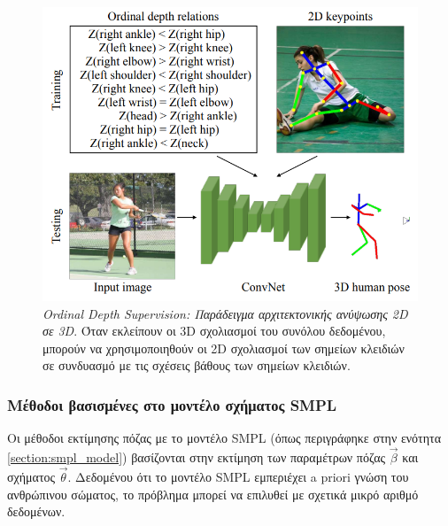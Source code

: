  \begin{figure}[h!]
    \centering
    \includegraphics[scale=0.5]{images/chapter2/3d_pose_estimation/ordinal_depth_architecture.png}
    \caption[Ordinal Depth Supervision: Παράδειγμα αρχιτεκτονικής ανύψωσης 2D σε 3D]{\textsl{Ordinal Depth Supervision: Παράδειγμα αρχιτεκτονικής ανύψωσης 2D σε 3D}. Όταν εκλείπουν οι 3D σχολιασμοί του συνόλου δεδομένου, μπορούν να χρησιμοποιηθούν οι 2D σχολιασμοί των σημείων κλειδιών σε συνδυασμό με τις σχέσεις βάθους των σημείων κλειδιών.}
    \label{fig:ordinal_depth_architecture}
\end{figure}

\subsubsection{Μέθοδοι βασισμένες στο μοντέλο σχήματος SMPL}

Οι μέθοδοι εκτίμησης πόζας με το μοντέλο SMPL (όπως περιγράφηκε στην ενότητα \ref{section:smpl_model}) βασίζονται στην εκτίμηση των παραμέτρων πόζας $\vec{\beta}$ και σχήματος $\vec{\theta}$. Δεδομένου ότι το μοντέλο SMPL εμπεριέχει a priori γνώση του ανθρώπινου σώματος, το πρόβλημα μπορεί να επιλυθεί με σχετικά μικρό αριθμό δεδομένων. 

